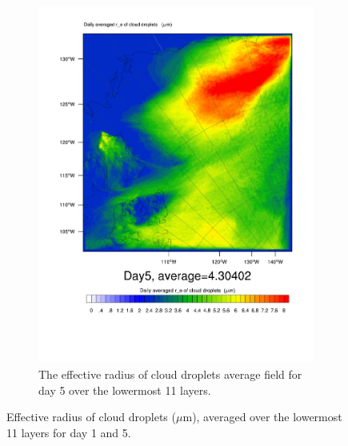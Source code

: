 \begin{figure}[h]
\begin{subfigure}{0.48\textwidth}
		\includegraphics[width=\textwidth]{results/control/RE_CLOUD_Day5.pdf}
		\caption{The effective radius of cloud droplets average field for day 5 over the lowermost 11 layers.}
		\label{subfig:recloud_r1Day5}
	\end{subfigure}
	\caption{Effective radius of cloud droplets ($\mu\text{m}$), averaged over the lowermost 11 layers for day 1 and 5.}
	\label{fig:recloud_r1}
\end{figure}


